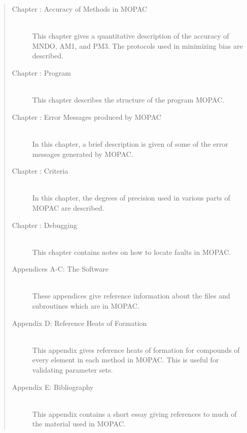 \begin{quote}
\begin{description}
\item[Chapter \thechapters: Accuracy of Methods in MOPAC]~\\
This chapter gives a quantitative description of the accuracy of MNDO, AM1,
and PM3. The protocols used in minimizing bias are described.
  \setcounter{accuracychapter}{\thechapters}
\addtocounter{chapters}{1}

\item[Chapter \thechapters: Program]~\\
This chapter describes the structure of the program MOPAC.
  \setcounter{programchapter}{\thechapters}
\addtocounter{chapters}{1}

\item[Chapter \thechapters: Error Messages produced by MOPAC]~\\
In this chapter, a brief description is given of some of the error messages
generated by MOPAC.
  \setcounter{errorchapter}{\thechapters}
\addtocounter{chapters}{1}

\item[Chapter \thechapters: Criteria]~\\
In this chapter, the degrees of precision used in various parts of MOPAC
are described.
\addtocounter{chapters}{1}

\item[Chapter \thechapters: Debugging]~\\
This chapter contains notes on how to locate faults in MOPAC.
\addtocounter{chapters}{1}


\item[Appendices A-C: The Software]~\\
These appendices give reference information about the files and subroutines
which are in MOPAC.

\item[Appendix D: Reference Heats of Formation]~\\
This appendix gives reference heats of formation for compounds of every element
in each method in MOPAC.  This is useful for validating parameter sets.

\item[Appendix E: Bibliography]~\\
This appendix contains a short essay giving references to much of the
material used in MOPAC.
\end{description}
\end{quote}

